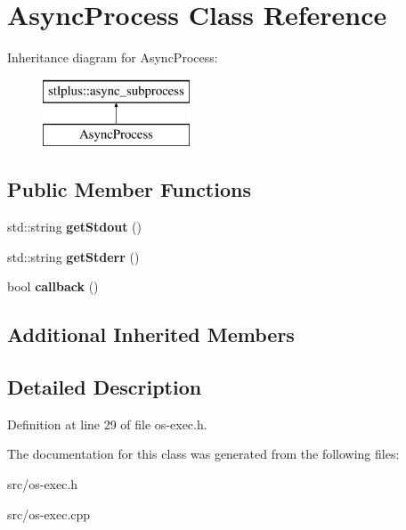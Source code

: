 \hypertarget{class_async_process}{}\section{Async\+Process Class Reference}
\label{class_async_process}
Inheritance diagram for Async\+Process\+:\begin{figure}[H]
\begin{center}
\leavevmode
\includegraphics[height=2.000000cm]{class_async_process}
\end{center}
\end{figure}
\subsection*{Public Member Functions}
\begin{DoxyCompactItemize}
\item 
std\+::string {\bfseries get\+Stdout} ()\hypertarget{class_async_process_abf6ed50a07d3272ad6a130bc10b45ae1}{}\label{class_async_process_abf6ed50a07d3272ad6a130bc10b45ae1}

\item 
std\+::string {\bfseries get\+Stderr} ()\hypertarget{class_async_process_a96a0f231e60671748ed8b4949d11b9ad}{}\label{class_async_process_a96a0f231e60671748ed8b4949d11b9ad}

\item 
bool {\bfseries callback} ()\hypertarget{class_async_process_a327fdd120a484a94739e7b8f8f9fad95}{}\label{class_async_process_a327fdd120a484a94739e7b8f8f9fad95}

\end{DoxyCompactItemize}
\subsection*{Additional Inherited Members}


\subsection{Detailed Description}


Definition at line 29 of file os-\/exec.\+h.



The documentation for this class was generated from the following files\+:\begin{DoxyCompactItemize}
\item 
src/os-\/exec.\+h\item 
src/os-\/exec.\+cpp\end{DoxyCompactItemize}
